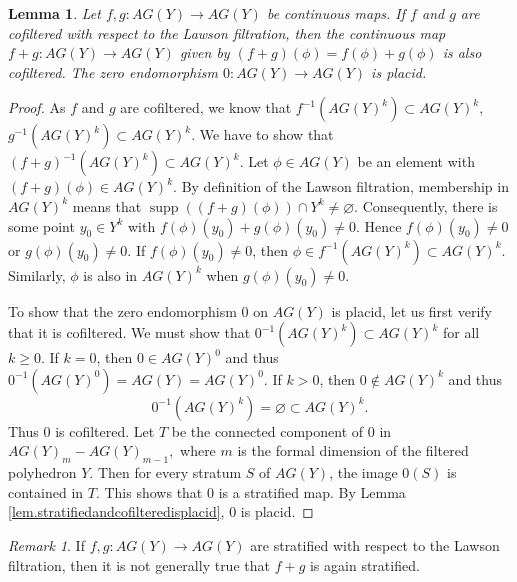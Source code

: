 \documentclass{amsart}
\newtheorem{lemma}[thm]{Lemma}
\theoremstyle{definition}
\theoremstyle{remark}
\newtheorem{remark}[thm]{Remark}
\newcommand {\supp}  {\ensuremath{\operatorname{supp}}}
\begin{document}
\begin{lemma} \label{lem.sumofcofilterediscofandzeroisplacid}
Let $f,g: AG(Y) \to AG(Y)$ be continuous maps. 
If $f$ and $g$ are cofiltered with respect to the Lawson filtration,
then the continuous map $f+g: AG(Y) \to AG(Y)$ given by 
$(f+g)(\phi) = f(\phi) + g(\phi)$ is also cofiltered.
The zero endomorphism $0: AG(Y) \to AG(Y)$ is placid.
\end{lemma}
\begin{proof}
As $f$ and $g$ are cofiltered, we know that
$f^{-1} (AG(Y)^k) \subset AG(Y)^k,$
$g^{-1} (AG(Y)^k) \subset AG(Y)^k.$
We have to show that
$(f+g)^{-1} (AG(Y)^k) \subset AG(Y)^k.$
Let $\phi \in AG(Y)$ be an element with $(f+g)(\phi) \in AG(Y)^k$.
By definition of the Lawson filtration, membership in $AG(Y)^k$
means that
$\supp ((f+g)(\phi)) \cap Y^k \not= \varnothing.$
Consequently, there is some point $y_0 \in Y^k$
with $f(\phi)(y_0) + g(\phi)(y_0) \not= 0$.
Hence $f(\phi)(y_0) \not= 0$
or $g(\phi)(y_0) \not= 0$.
If $f(\phi)(y_0) \not= 0$, then
$\phi \in f^{-1} (AG(Y)^k) \subset AG(Y)^k.$
Similarly, $\phi$ is also in $AG(Y)^k$ when $g(\phi)(y_0) \not= 0$.

To show that the zero endomorphism $0$ on $AG(Y)$ is placid, 
let us first verify that it is cofiltered.
We must show that $0^{-1} (AG(Y)^k) \subset AG(Y)^k$ for all $k\geq 0$.
If $k=0$, then $0\in AG(Y)^0$ and thus
$0^{-1} (AG(Y)^0) = AG(Y) = AG(Y)^0.$
If $k>0$, then $0\not\in AG(Y)^k$ and thus
\[ 0^{-1} (AG(Y)^k) = \varnothing \subset AG(Y)^k. \]
Thus $0$ is cofiltered.
Let $T$ be the connected component of $0$ in $AG(Y)_m - AG(Y)_{m-1},$
where $m$ is the formal dimension of the filtered polyhedron $Y$.
Then for every stratum $S$ of $AG(Y)$, the image $0(S)$ is contained
in $T$. This shows that $0$ is a stratified map.
By Lemma \ref{lem.stratifiedandcofilteredisplacid}, $0$ is placid.
\end{proof}

\begin{remark}
If $f,g: AG(Y)\to AG(Y)$ are
stratified with respect to the Lawson filtration, then
it is not generally true that $f+g$ is again stratified.
\end{remark}
\end{document}
